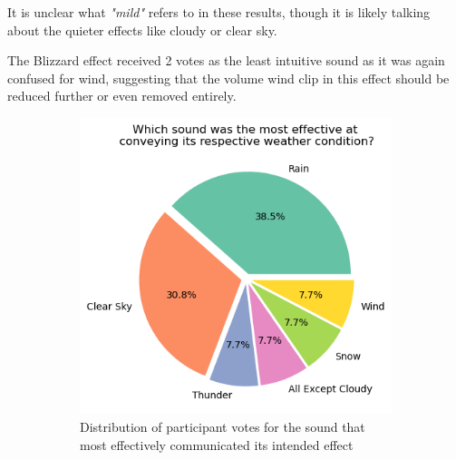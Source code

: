 \documentclass{l4proj}
\begin{document}
It is unclear what \emph{"mild"} refers to in these results, though it is likely talking about the quieter effects like cloudy or clear sky.

The Blizzard effect received 2 votes as the least intuitive sound as it was again confused for wind, suggesting that the volume wind clip in this effect should be reduced further or even removed entirely.

\begin{figure}[htb!] 
    \centering
    \begin{subfigure}[b]{0.7\textwidth}
        \includegraphics[width=\textwidth]{images/graphs/most_effective_pie.png}
        \caption{Distribution of participant votes for the sound that most effectively communicated its intended effect}
        \label{fig:syn1}
    \end{subfigure}
    \\
    \begin{subfigure}[b]{0.7\textwidth}

\end{subfigure}
\end{figure}
\end{document}

